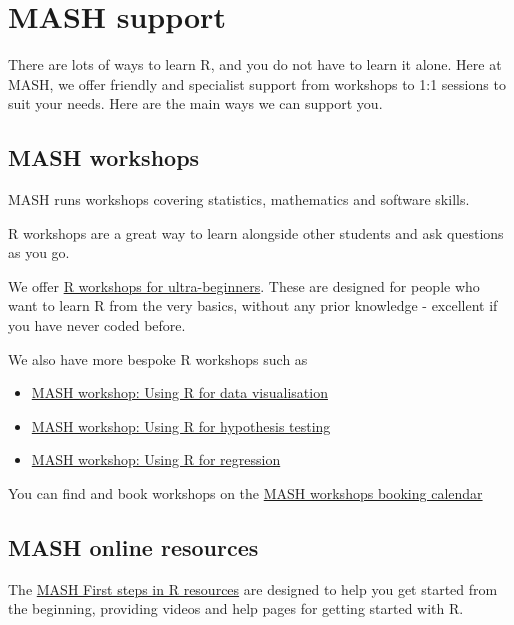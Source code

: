 \documentclass[
]{book}
\providecommand{\tightlist}{%
  \setlength{\itemsep}{0pt}\setlength{\parskip}{0pt}}
\begin{document}
\section{MASH support}\label{mash-support}

There are lots of ways to learn R, and you do not have to learn it alone. Here at MASH, we offer friendly and specialist support from workshops to 1:1 sessions to suit your needs. Here are the main ways we can support you.

\subsection{MASH workshops}\label{mash-workshops}

MASH runs workshops covering statistics, mathematics and software skills.

R workshops are a great way to learn alongside other students and ask questions as you go.

We offer \href{https://301skills.shef.ac.uk/events/284/upcoming}{R workshops for ultra-beginners}. These are designed for people who want to learn R from the very basics, without any prior knowledge - excellent if you have never coded before.

We also have more bespoke R workshops such as

\begin{itemize}
\tightlist
\item
  \href{https://301skills.shef.ac.uk/events/287/upcoming}{MASH workshop: Using R for data visualisation}
\item
  \href{https://301skills.shef.ac.uk/events/391/upcoming}{MASH workshop: Using R for hypothesis testing}
\item
  \href{https://301skills.shef.ac.uk/events/291/upcoming}{MASH workshop: Using R for regression}
\end{itemize}

You can find and book workshops on the \href{https://students.sheffield.ac.uk/mash/workshops\#bookig-calendar}{MASH workshops booking calendar}

\subsection{MASH online resources}\label{mash-online-resources}

The \href{https://sheffield.ac.uk/mash/stats-resources/r\#First-steps}{MASH First steps in R resources} are designed to help you get started from the beginning, providing videos and help pages for getting started with R.
\end{document}
